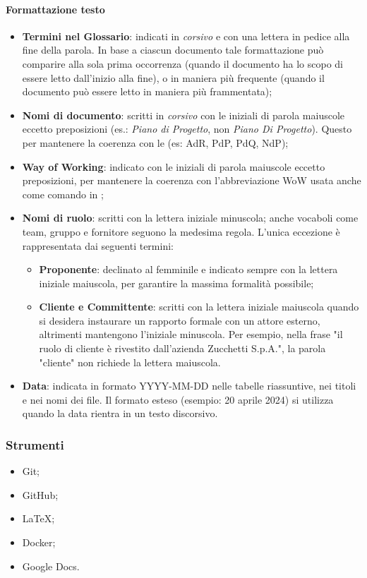 \paragraph{Formattazione testo}
\begin{itemize}
  \item \textbf{Termini nel Glossario}: indicati in \textit{corsivo} e con una lettera  in pedice alla fine della parola. In base a ciascun documento tale formattazione può comparire alla sola prima occorrenza (quando il documento ha lo scopo di essere letto dall'inizio alla fine), o in maniera più frequente (quando il documento può essere letto in maniera più frammentata);
  \item \textbf{Nomi di documento}: scritti in \textit{corsivo} con le iniziali di parola maiuscole eccetto preposizioni (es.: \textit{Piano di Progetto}, non \textit{Piano Di Progetto}). Questo per mantenere la coerenza con le  (es: AdR, PdP, PdQ, NdP);
  \item \textbf{Way of Working}: indicato con le iniziali di parola maiuscole eccetto preposizioni, per mantenere la coerenza con l'abbreviazione WoW usata anche come comando in ;
  \item \textbf{Nomi di ruolo}: scritti con la lettera iniziale minuscola; anche vocaboli come team, gruppo e fornitore seguono la medesima regola. L'unica eccezione è rappresentata dai seguenti termini:
  \begin{itemize}
    \item \textbf{Proponente}: declinato al femminile e indicato sempre con la lettera iniziale maiuscola, per garantire la massima formalità possibile;
    \item \textbf{Cliente e Committente}: scritti con la lettera iniziale maiuscola quando si desidera instaurare un rapporto formale con un attore esterno, altrimenti mantengono l'iniziale minuscola. Per esempio, nella frase "il ruolo di cliente è rivestito dall'azienda Zucchetti S.p.A.", la parola "cliente" non richiede la lettera maiuscola.
  \end{itemize}
  \item \textbf{Data}: indicata in formato YYYY-MM-DD nelle tabelle riassuntive, nei titoli e nei nomi dei file. Il formato esteso (esempio: 20 aprile 2024) si utilizza quando la data rientra in un testo discorsivo.
\end{itemize}

\subsubsection{Strumenti}
\IntroStrumenti
\begin{itemize}
  \item Git;
  \item GitHub;
  \item LaTeX;
  \item Docker;
  \item Google Docs.
\end{itemize}
